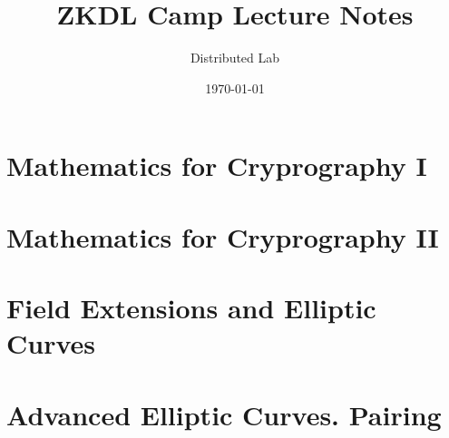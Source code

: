 \documentclass{zkdl-template}
\title{\huge\sffamily\bfseries ZKDL Camp Lecture Notes}
\author{\Large\sffamily Distributed Lab}
\date{\sffamily \today}
\begin{document}
\pagestyle{fancy}

\maketitle

\section{Mathematics for Cryprography I}



\section{Mathematics for Cryprography II}



\section{Field Extensions and Elliptic Curves}



\section{Advanced Elliptic Curves. Pairing}


\end{document}
